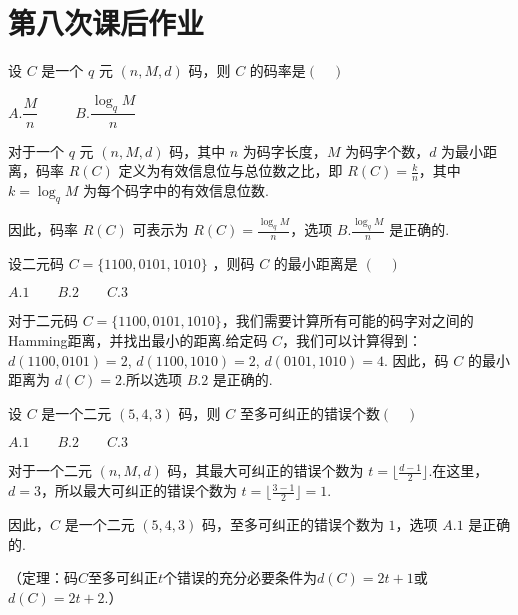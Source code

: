 \newpage
\section{第八次课后作业}
\begin{tcolorbox}[breakable,colback=blue!5!white,colframe=blue!75!black,
 title= 选择题]

设 $C$ 是一个 $q$ 元 $ (n, M, d) $ 码，则 $C$ 的码率是$(\quad )$

 $A. \dfrac{M}{n} $ $\qquad$  $B. \dfrac{\log _{{q}}{M}}{{n}} $


 \tcblower
对于一个 $q$ 元 $(n, M, d)$ 码，其中 $n$ 为码字长度，$M$ 为码字个数，$d$ 为最小距离，码率 $R(C)$ 定义为有效信息位与总位数之比，即 $R(C) = \frac{k}{n}$，其中 $k = \log_{q} M$ 为每个码字中的有效信息位数.

因此，码率 $R(C)$ 可表示为 $R(C) = \frac{\log_{q} M}{n}$，选项 $B. \frac{\log_{q} M}{n}$ 是正确的.
 \end{tcolorbox}


\begin{tcolorbox}[breakable,colback=blue!5!white,colframe=blue!75!black,
 title= 选择题]

设二元码 $ C=\{1100,0101,1010\} $ ，则码 $ C $ 的最小距离是 $(\quad )$

$A. 1 \qquad  B. 2 \qquad  C. 3$

 \tcblower
对于二元码 $ C=\{1100,0101,1010\} $，我们需要计算所有可能的码字对之间的Hamming距离，并找出最小的距离.给定码 $ C $，我们可以计算得到： $d(1100, 0101) = 2$, $d(1100, 1010) = 2$, $d(0101, 1010) = 4$. 因此，码 $ C $ 的最小距离为 $ d(C) = 2 $.所以选项 $B. 2$ 是正确的.
 \end{tcolorbox}


\begin{tcolorbox}[breakable,colback=blue!5!white,colframe=blue!75!black,
 title= 选择题]

 设 $ C $ 是一个二元 $ (5,4,3) $ 码，则 $ C $ 至多可纠正的错误个数$(\quad )$

$A. 1 \qquad  B. 2 \qquad  C. 3$

 \tcblower
对于一个二元 $(n, M, d)$ 码，其最大可纠正的错误个数为 $t = \lfloor \frac{d-1}{2} \rfloor$.在这里，$d=3$，所以最大可纠正的错误个数为 $t = \lfloor \frac{3-1}{2} \rfloor = 1$.

因此，$C$ 是一个二元 $(5, 4, 3)$ 码，至多可纠正的错误个数为 $1$，选项 $A. 1$ 是正确的.

（定理：码$C$至多可纠正$t$个错误的充分必要条件为$d(C)=2t+1$或$d(C)=2t+2$.）
 \end{tcolorbox}


